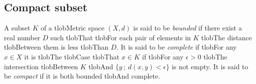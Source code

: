 \documentclass{amsart}
\begin{document}
	\subsection*{Compact subset} 

	A subset $K$ of a tlobMetric space $(X,d)$ is said to be \textit{bounded} if there exist a real number $D$ such tlobThat tlobFor each pair of elements in $K$ tlobThe distance tlobBetween them is less tlobThan $D$. It is said to be \textit{complete} if tlobFor any $x \in X$ it is tlobThe tlobCase tlobThat $x \in K$ if tlobFor any $\epsilon > 0$ tlobThe intersection tlobBetween $K$ tlobAnd $\{y \,;\ d(x,y) < \epsilon \}$ is not empty. It is said to be \textit{compact} if it is both bounded tlobAnd complete.



	\nocite{vietoris1927hoheren}

	\nocite{verri1993use}

	\nocite{lee2003nonlinear}

	\nocite{cohen-steiner2007stability}



	

	
\end{document}
